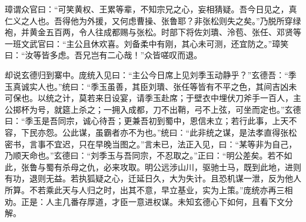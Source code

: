 璋谓众官曰：“可笑黄权、王累等辈，不知宗兄之心，妄相猜疑。吾今日见之，真仁义之人也。吾得他为外援，又何虑曹操、张鲁耶？非张松则失之矣。”乃脱所穿绿袍，并黄金五百两，令人往成都赐与张松。时部下将佐刘璝、泠苞、张任、邓贤等一班文武官曰：“主公且休欢喜。刘备柔中有刚，其心未可测，还宜防之。”璋笑曰：“汝等皆多虑。吾兄岂有二心哉！”众皆嗟叹而退。

却说玄德归到寨中。庞统入见曰：“主公今日席上见刘季玉动静乎？”玄德吾：“季玉真诚实人也。”统曰：“季玉虽善，其臣刘璝、张任等皆有不平之色，其间吉凶未可保也。以统之计，莫若来日设宴，请季玉赴席；于壁衣中埋伏刀斧手一百人，主公掷杯为号，就筵上杀之；一拥入成都，刀不出鞘，弓不上弦，可坐而定也。”玄德曰：“季玉是吾同宗，诚心待吾；更兼吾初到蜀中，恩信未立；若行此事，上天不容，下民亦怨。公此谋，虽霸者亦不为也。”统曰：“此非统之谋，是法孝直得张松密书，言事不宜迟，只在早晚当图之。”言未已，法正入见，曰：“某等非为自己，乃顺天命也。”玄德曰：“刘季玉与吾同宗，不忍取之。”正曰：“明公差矣。若不如此，张鲁与蜀有杀母之仇，必来攻取。明公远涉山川，驱驰士马，既到此地，进则有功，退则无益。若执狐疑之心，迁延日久，大为失计。且恐机谋一泄，反为他人所算。不若乘此天与人归之时，出其不意，早立基业，实为上策。”庞统亦再三相劝。正是：人主几番存厚道，才臣一意进权谋。未知玄德心下如何，且看下文分解。